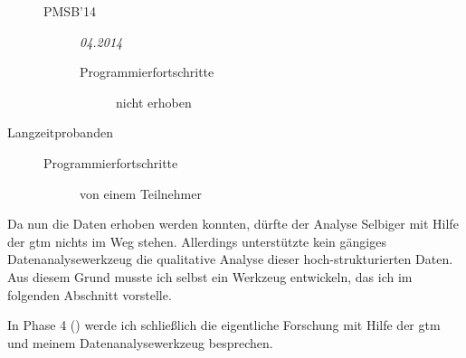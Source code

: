 \begin{description}
\begin{description}
    \item[PMSB'14] \textit{04.2014}
    \begin{description}
      \item[Programmierfortschritte] nicht erhoben
    \end{description}
  \end{description}
  
  \item[Langzeitprobanden] \hfill
  \begin{description}
    \item[Programmierfortschritte] von einem Teilnehmer %
  \end{description}
\end{description}

\bigskip

Da nun die Daten erhoben werden konnten, dürfte der Analyse Selbiger mit Hilfe der \gls{gtm} nichts im Weg stehen. Allerdings unterstützte kein gängiges Datenanalysewerkzeug die qualitative Analyse dieser hoch-strukturierten Daten. Aus diesem Grund musste ich selbst ein Werkzeug entwickeln, das ich im folgenden Abschnitt vorstelle.

In Phase 4 () werde ich schließlich die eigentliche Forschung mit Hilfe der \gls{gtm} und meinem Datenanalysewerkzeug besprechen.